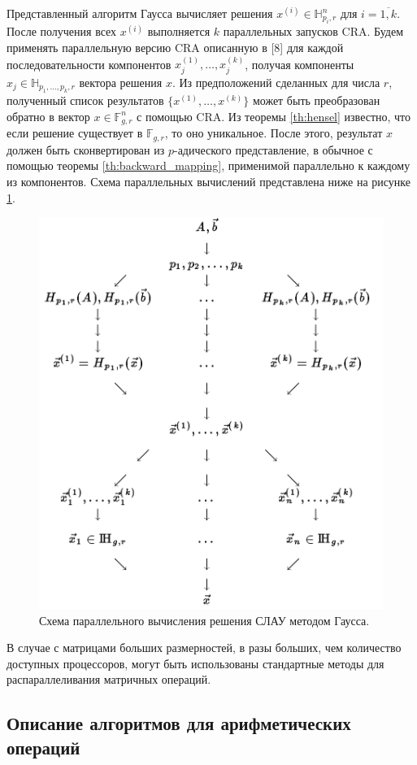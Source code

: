 \documentclass[master, och, diploma, times]{sty/SCWorks}
\theoremstyle{plain}
\theoremstyle{definition}
\begin{document}
Представленный алгоритм Гаусса вычисляет решения $x^{(i)} \in \mathbb{H}_{p_i,r}^n$ для $i = \overline{1,k}$. После получения всех $x^{(i)}$ выполняется $k$ параллельных запусков CRA. Будем применять параллельную версию CRA описанную в [8] для каждой последовательности компонентов $x_j^{(1)}, \dots, x_j^{(k)}$, получая компоненты $x_j \in \mathbb{H}_{p_1,\dots,p_k,r}$ вектора решения $x$.
Из предположений сделанных для числа $r$, полученный список результатов $\{x^{(1)},\dots,x^{(k)}\}$ может быть преобразован обратно в вектор $x \in \mathbb{F}_{g,r}^n$ с помощью CRA. Из теоремы \ref{th:hensel} известно, что если решение существует в $\mathbb{F}_{g,r}$, то оно уникальное.
После этого, результат $x$ должен быть сконвертирован из $p$-адического представление, в обычное с помощью теоремы \ref{th:backward_mapping}, применимой параллельно к каждому из компонентов. Схема параллельных вычислений представлена ниже на рисунке \ref{img:multi:gauss}.

\begin{figure}[H]
\centerline{\includegraphics[width=0.7\linewidth]{images/multi/native.png}}
\caption{Схема параллельного вычисления решения СЛАУ методом Гаусса.}
\label{img:multi:gauss}
\end{figure}


В случае с матрицами больших размерностей, в разы больших, чем количество доступных процессоров, могут быть использованы стандартные методы для распараллеливания матричных операций.


\subsection{Описание алгоритмов для арифметических операций}
\end{document}
